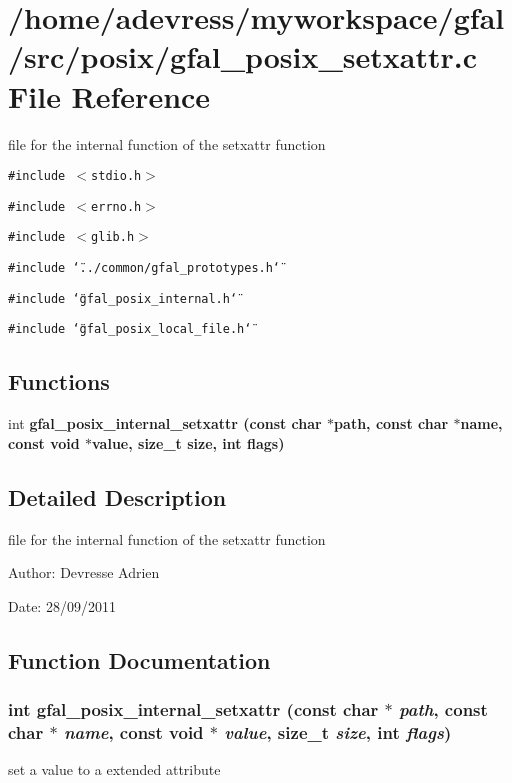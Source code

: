 \section{/home/adevress/myworkspace/gfal/src/posix/gfal\_\-posix\_\-setxattr.c File Reference}
\label{gfal__posix__setxattr_8c}
file for the internal function of the setxattr function 

{\tt \#include $<$stdio.h$>$}\par
{\tt \#include $<$errno.h$>$}\par
{\tt \#include $<$glib.h$>$}\par
{\tt \#include \char`\"{}../common/gfal\_\-prototypes.h\char`\"{}}\par
{\tt \#include \char`\"{}gfal\_\-posix\_\-internal.h\char`\"{}}\par
{\tt \#include \char`\"{}gfal\_\-posix\_\-local\_\-file.h\char`\"{}}\par
\subsection*{Functions}
\begin{CompactItemize}
\item 
int \bf{gfal\_\-posix\_\-internal\_\-setxattr} (const char $\ast$path, const char $\ast$name, const void $\ast$value, size\_\-t size, int flags)
\end{CompactItemize}


\subsection{Detailed Description}
file for the internal function of the setxattr function 

\begin{Desc}
\item[Author:]Devresse Adrien \end{Desc}
\begin{Desc}
\item[Date:]28/09/2011 \end{Desc}


\subsection{Function Documentation}
\subsubsection{\setlength{\rightskip}{0pt plus 5cm}int gfal\_\-posix\_\-internal\_\-setxattr (const char $\ast$ {\em path}, const char $\ast$ {\em name}, const void $\ast$ {\em value}, size\_\-t {\em size}, int {\em flags})}\label{gfal__posix__setxattr_8c_c67a63706af21829d0e7b9209be4cfce}


set a value to a extended attribute 